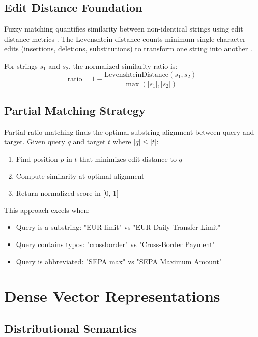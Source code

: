 \subsection{Edit Distance Foundation}

Fuzzy matching quantifies similarity between non-identical strings using edit distance metrics \cite{navarro2001guided}. The Levenshtein distance counts minimum single-character edits (insertions, deletions, substitutions) to transform one string into another \cite{levenshtein1966}.

For strings $s_1$ and $s_2$, the normalized similarity ratio is:
\[
\text{ratio} = 1 - \frac{\text{LevenshteinDistance}(s_1, s_2)}{\max(|s_1|, |s_2|)}
\]

\subsection{Partial Matching Strategy}

Partial ratio matching finds the optimal substring alignment between query and target. Given query $q$ and target $t$ where $|q| \leq |t|$:

\begin{enumerate}[leftmargin=*,itemsep=2pt,topsep=2pt]
\item Find position $p$ in $t$ that minimizes edit distance to $q$
\item Compute similarity at optimal alignment
\item Return normalized score in [0, 1]
\end{enumerate}

This approach excels when:
\begin{itemize}[leftmargin=*,itemsep=2pt,topsep=2pt]
\item Query is a substring: "EUR limit" vs "EUR Daily Transfer Limit"
\item Query contains typos: "crossborder" vs "Cross-Border Payment"
\item Query is abbreviated: "SEPA max" vs "SEPA Maximum Amount"
\end{itemize}

\section{Dense Vector Representations}

\subsection{Distributional Semantics}

